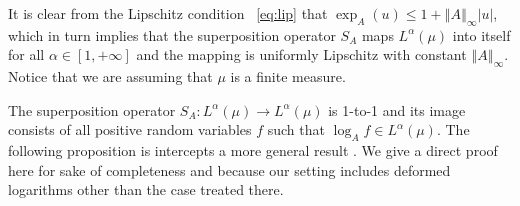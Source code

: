 \documentclass[graybox]{svmult}
\begin{document}
It is clear from the Lipschitz condition ~\eqref{eq:lip} that $\exp _{A}(u)\leq 1+\left\Vert
A\right\Vert _{\infty }\left\vert u\right\vert $, which in turn implies that
the superposition operator $S_{A}$ maps $L^{\alpha }(\mu )$ into itself for all $\alpha \in [1,+\infty]$ and the mapping is uniformly Lipschitz
with constant $\left\Vert A\right\Vert _{\infty }$. Notice that we are
assuming that $\mu$ is a finite measure.

The superposition operator $S_{A}\colon L^{\alpha }(\mu )\rightarrow L^{\alpha }(\mu )$ is 1-to-1 and its image consists of all positive random variables $f$ such that $\log _{A}f\in L^{\alpha }(\mu )$. The following proposition is intercepts a more general result \cite{newton:2016}. We give a direct proof here for sake of completeness and because our setting includes deformed logarithms other than the case treated there.
\end{document}
